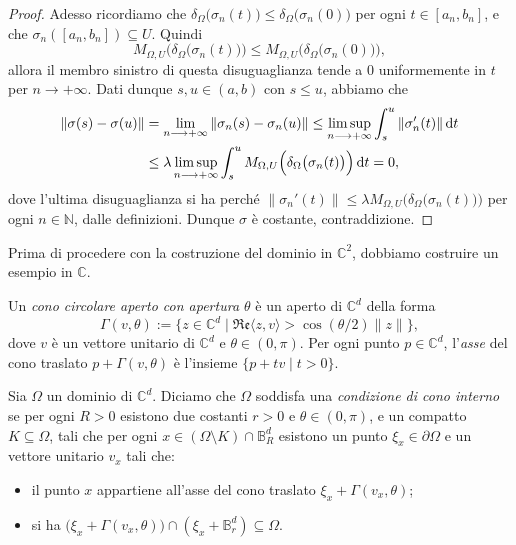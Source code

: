 \begin{proof}
    Adesso ricordiamo che $\delta_\Omega\big(\sigma_n(t)\big)\le\delta_\Omega\big(\sigma_n(0)\big)$ per ogni $t\in[a_n,b_n]$, e che $\sigma_n([a_n,b_n])\subseteq U$. Quindi
    $$M_{\Omega,U}\Big(\delta_\Omega\big(\sigma_n(t)\big)\Big) \le M_{\Omega,U}\Big(\delta_\Omega\big(\sigma_n(0)\big)\Big),$$
    allora il membro sinistro di questa disuguaglianza tende a $0$ uniformemente in $t$ per $n\longrightarrow+\infty$. Dati dunque $s,u\in(a,b)$ con $s\le u$, abbiamo che
    \begin{align*}
        \|\sigma(s)-\sigma(u)\|&=\lim_{n\longrightarrow+\infty}\|\sigma_n(s)-\sigma_n(u)\| \le \limsup_{n\longrightarrow+\infty}\int_s^u\|\sigma_n'(t)\|\mathop{}\!\mathrm{d} t \\
        &\le \lambda\limsup_{n\longrightarrow+\infty}\int_s^uM_{\Omega,U}\Big(\delta_\Omega\big(\sigma_n(t)\big)\Big)\mathop{}\!\mathrm{d} t=0,
    \end{align*}
    dove l'ultima disuguaglianza si ha perché $\|\sigma_n'(t)\|\le\lambda M_{\Omega,U}\Big(\delta_\Omega\big(\sigma_n(t)\big)\Big)$ per ogni $n\in\mathbb{N}$, dalle definizioni. Dunque $\sigma$ è costante, contraddizione.
\end{proof}

Prima di procedere con la costruzione del dominio in $\mathbb{C}^2$, dobbiamo costruire un esempio in $\mathbb{C}$.

\begin{defn}
    Un \textit{cono circolare aperto con apertura $\theta$} è un aperto di $\mathbb{C}^d$ della forma
    $$\Gamma(v,\theta):=\{z\in\mathbb{C}^d\mid \mathfrak{Re}\langle z,v\rangle>\cos(\theta/2)\|z\|\},$$
    dove $v$ è un vettore unitario di $\mathbb{C}^d$ e $\theta\in(0,\pi)$. Per ogni punto $p\in\mathbb{C}^d$, l'\textit{asse} del cono traslato $p+\Gamma(v,\theta)$ è l'insieme $\{p+tv\mid t>0\}$.
\end{defn}

\begin{defn}
    Sia $\Omega$ un dominio di $\mathbb{C}^d$. Diciamo che $\Omega$ soddisfa una \textit{condizione di cono interno} se per ogni $R>0$ esistono due costanti $r>0$ e $\theta\in(0,\pi)$, e un compatto $K\subseteq\Omega$, tali che per ogni $x\in(\Omega\setminus K)\cap\mathbb{B}^d_R$ esistono un punto $\xi_x\in\partial\Omega$ e un vettore unitario $v_x$ tali che:
    \begin{itemize}
        \item il punto $x$ appartiene all'asse del cono traslato $\xi_x+\Gamma(v_x,\theta)$;
        \item si ha $\big(\xi_x+\Gamma(v_x,\theta)\big)\cap (\xi_x+\mathbb{B}^d_r)\subseteq\Omega$.
    \end{itemize}
\end{defn}

